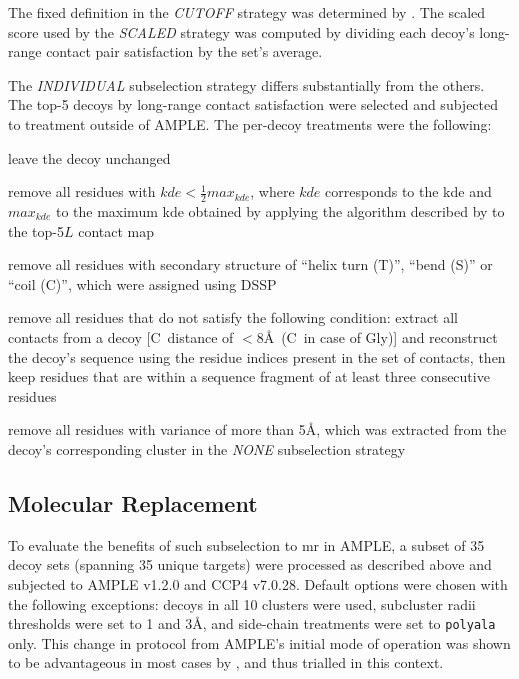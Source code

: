 The fixed definition in the \textit{CUTOFF} strategy was determined by \textcite{De_Oliveira2017-gj}. The scaled score used by the \textit{SCALED} strategy was computed by dividing each decoy's long-range contact pair satisfaction by the set's average.

The \textit{INDIVIDUAL} subselection strategy differs substantially from the others. The top-5 decoys by long-range contact satisfaction were selected and subjected to treatment outside of AMPLE. The per-decoy treatments were the following:

\begin{description}[style=multiline,leftmargin=4cm]
    \item[default] leave the decoy unchanged
    \item[domain] remove all residues with $kde<\frac{1}{2}max_{kde}$, where $kde$ corresponds to the \gls{kde} and $max_{kde}$ to the maximum \gls{kde} obtained by applying the algorithm described by \textcite{Sadowski2013-zu} to the top-5$L$ contact map
    \item[dssp] remove all residues with secondary structure of ``helix turn (T)'', ``bend (S)'' or ``coil (C)'', which were assigned using DSSP \cite{Frishman1995-si} 
    \item[fragment] remove all residues that do not satisfy the following condition: extract all contacts from a decoy [C\textbeta\ distance of $<8$\AA\ (C\textalpha\ in case of Gly)] and reconstruct the decoy's sequence using the residue indices present in the set of contacts, then keep residues that are within a sequence fragment of at least three consecutive residues
    \item[variance] remove all residues with variance of more than 5\AA, which was extracted from the decoy's corresponding cluster in the \textit{NONE} subselection strategy
\end{description}

\subsection{Molecular Replacement} \label{subsec:ample_decoys_methods_mr}
To evaluate the benefits of such subselection to \gls{mr} in AMPLE, a subset of 35 decoy sets (spanning 35 unique targets) were processed as described above and subjected to AMPLE v1.2.0 and CCP4 v7.0.28. Default options were chosen with the following exceptions: decoys in all 10 clusters were used, subcluster radii thresholds were set to 1 and 3\AA, and side-chain treatments were set to \texttt{polyala} only. This change in protocol from AMPLE's initial mode of operation \cite{Bibby2012-lm} was shown to be advantageous in most cases by \textcite{Thomas2017-qu}, and thus trialled in this context. 

